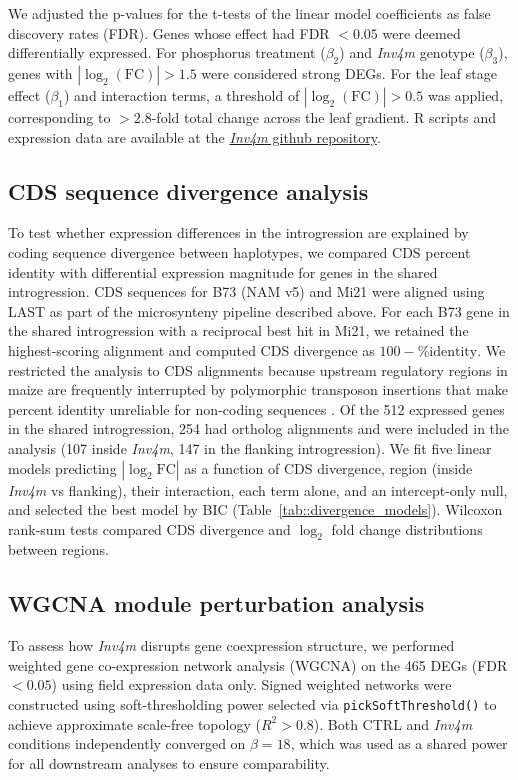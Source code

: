 \documentclass[9pt,twocolumn,twoside]{rilabRxiv}
\newcommand{\invfour}{\textit{Inv4m}\xspace}
\begin{document}
We adjusted the p-values for the t-tests of the linear model coefficients as false discovery rates (FDR).
Genes whose effect had FDR $< 0.05$ were deemed differentially expressed.
For phosphorus treatment ($\beta_2$) and \invfour genotype ($\beta_3$), genes with $|\log_2(\text{FC})| > 1.5$ were considered strong DEGs.
For the leaf stage effect ($\beta_1$) and interaction terms, a threshold of $|\log_2(\text{FC})| > 0.5$ was applied, corresponding to $>2.8$-fold total change across the leaf gradient.
R scripts and expression data are available at the \href{https://github.com/sawers-rellan-labs/inv4m}{\invfour github repository}.

\subsection{CDS sequence divergence analysis}

To test whether expression differences in the introgression are explained by coding sequence divergence between haplotypes, we compared CDS percent identity with differential expression magnitude for genes in the shared introgression.
CDS sequences for B73 (NAM v5) and Mi21 were aligned using LAST \cite{kielbasa2011} as part of the microsynteny pipeline described above.
For each B73 gene in the shared introgression with a reciprocal best hit in Mi21, we retained the highest-scoring alignment and computed CDS divergence as $100 - \text{\% identity}$.
We restricted the analysis to CDS alignments because upstream regulatory regions in maize are frequently interrupted by polymorphic transposon insertions that make percent identity unreliable for non-coding sequences \cite{liang2022}.
Of the 512 expressed genes in the shared introgression, 254 had ortholog alignments and were included in the analysis (107 inside \invfour, 147 in the flanking introgression).
We fit five linear models predicting $|\log_2\text{FC}|$ as a function of CDS divergence, region (inside \invfour vs flanking), their interaction, each term alone, and an intercept-only null, and selected the best model by BIC (Table~\ref{tab::divergence_models}).
Wilcoxon rank-sum tests compared CDS divergence and $\log_2$ fold change distributions between regions.

\subsection{WGCNA module perturbation analysis}

To assess how \invfour disrupts gene coexpression structure, we performed weighted gene co-expression network analysis (WGCNA) \cite{langfelder2008} on the 465 DEGs (FDR $< 0.05$) using field expression data only.
Signed weighted networks were constructed using soft-thresholding power selected via \texttt{pickSoftThreshold()} to achieve approximate scale-free topology ($R^2 > 0.8$).
Both CTRL and \invfour conditions independently converged on $\beta = 18$, which was used as a shared power for all downstream analyses to ensure comparability.
\end{document}
